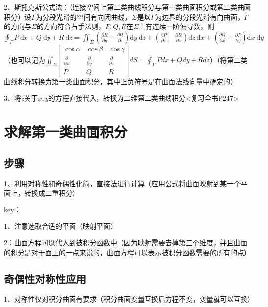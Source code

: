 2、斯托克斯公式法：（连接空间上第二类曲线积分与第一类曲面积分或第二类曲面积分）设$\Gamma$为分段光滑的空间有向闭曲线，$\Sigma$是以$\Gamma$为边界的分段光滑有向曲面，$\Gamma$的方向与$\Sigma$的方向符合右手法则，$P, Q, R$在$\Sigma$上有连续一阶偏导数，则$\oint_{\Gamma} P \mathrm{~d} x+Q \mathrm{~d} y+R \mathrm{~d} z=\iint_{\Sigma}\left(\frac{\partial R}{\partial y}-\frac{\partial Q}{\partial z}\right) \mathrm{d} y \mathrm{~d} z+\left(\frac{\partial P}{\partial z}-\frac{\partial R}{\partial x}\right) \mathrm{d} z \mathrm{~d} x+\left(\frac{\partial Q}{\partial x}-\frac{\partial P}{\partial y}\right) \mathrm{d} x \mathrm{~d} y$（也可以记为$\iint_{\Sigma}\left|\begin{array}{ccc}\cos \alpha & \cos \beta & \cos \gamma \\\frac{\partial}{\partial x} & \frac{\partial}{\partial y} & \frac{\partial}{\partial z} \\P & Q & R\end{array}\right| d S=\oint_{\Gamma} P d x+Q d y+R d z$）（将第二类曲线积分转换为第一类曲面积分，其中正负符号是在曲面法线向量中确定的）

3、将$z$关于$x,y$的方程直接代入，转换为二维第二类曲线积分<复习全书P247>

\section{求解第一类曲面积分}



\subsection{步骤}

1、利用对称性和奇偶性化简，直接法进行计算（应用公式将曲面映射到某一个平面上，转换成二重积分）

key：

1、注意选取合适的平面（映射平面）

2：曲面方程可以代入到被积分函数中（因为映射需要去掉第三个维度，并且曲面的积分是对于面上的一点来说的，曲面方程可以表示被积分函数需要的所有的点）



\subsection{奇偶性对称性应用}

1、对称性仅对积分曲面有要求（积分曲面变量互换后方程不变，变量就可以互换）

